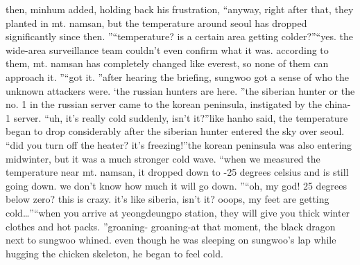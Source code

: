 then, minhum added, holding back his frustration, “anyway, right after that, they planted in mt.
 namsan, but the temperature around seoul has dropped significantly since then.
”“temperature? is a certain area getting colder?”“yes.
 the wide-area surveillance team couldn’t even confirm what it was.
 according to them, mt.
 namsan has completely changed like everest, so none of them can approach it.
”“got it.
”after hearing the briefing, sungwoo got a sense of who the unknown attackers were.
‘the russian hunters are here.
”the siberian hunter or the no.
 1 in the russian server came to the korean peninsula, instigated by the china-1 server.
“uh, it’s really cold suddenly, isn’t it?”like hanho said, the temperature began to drop considerably after the siberian hunter entered the sky over seoul.
“did you turn off the heater? it’s freezing!”the korean peninsula was also entering midwinter, but it was a much stronger cold wave.
“when we measured the temperature near mt.
 namsan, it dropped down to -25 degrees celsius and is still going down.
 we don’t know how much it will go down.
”“oh, my god! 25 degrees below zero? this is crazy.
 it’s like siberia, isn’t it? ooops, my feet are getting cold…”“when you arrive at yeongdeungpo station, they will give you thick winter clothes and hot packs.
”groaning- groaning-at that moment, the black dragon next to sungwoo whined.
 even though he was sleeping on sungwoo’s lap while hugging the chicken skeleton, he began to feel cold.


 
